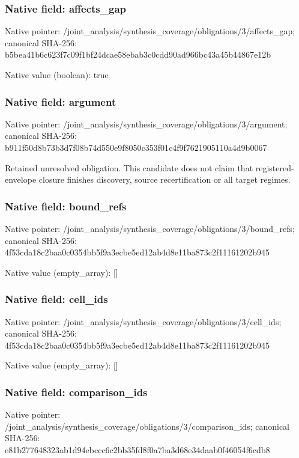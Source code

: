 \documentclass[10pt,a4paper]{article}
\begin{document}
\subsubsection{Native field: affects\_\allowbreak{}gap}
Native pointer: /joint\_\allowbreak{}analysis/synthesis\_\allowbreak{}coverage/obligations/3/affects\_\allowbreak{}gap; canonical SHA-256: b5bea41b6c623f7c09f1bf24dcae58ebab3c0cdd90ad966bc43a45b44867e12b

Native value (boolean): true

\subsubsection{Native field: argument}
Native pointer: /joint\_\allowbreak{}analysis/synthesis\_\allowbreak{}coverage/obligations/3/argument; canonical SHA-256: b911f50d8b73b3d7f08b74d550e9f8050c353f01c4f9f7621905110a4d9b0067

\begingroup\raggedright\sloppy Retained unresolved obligation. This candidate does not claim that registered-envelope closure finishes discovery,\allowbreak{} source recertification or all target regimes.\par\endgroup

\subsubsection{Native field: bound\_\allowbreak{}refs}
Native pointer: /joint\_\allowbreak{}analysis/synthesis\_\allowbreak{}coverage/obligations/3/bound\_\allowbreak{}refs; canonical SHA-256: 4f53cda18c2baa0c0354bb5f9a3ecbe5ed12ab4d8e11ba873c2f11161202b945

Native value (empty\_\allowbreak{}array): []

\subsubsection{Native field: cell\_\allowbreak{}ids}
Native pointer: /joint\_\allowbreak{}analysis/synthesis\_\allowbreak{}coverage/obligations/3/cell\_\allowbreak{}ids; canonical SHA-256: 4f53cda18c2baa0c0354bb5f9a3ecbe5ed12ab4d8e11ba873c2f11161202b945

Native value (empty\_\allowbreak{}array): []

\subsubsection{Native field: comparison\_\allowbreak{}ids}
Native pointer: /joint\_\allowbreak{}analysis/synthesis\_\allowbreak{}coverage/obligations/3/comparison\_\allowbreak{}ids; canonical SHA-256: e81b277648323ab1d94ebccc6c2bb35fd8f0a7ba3d68e34daab0f46054f6cdb8
\end{document}
